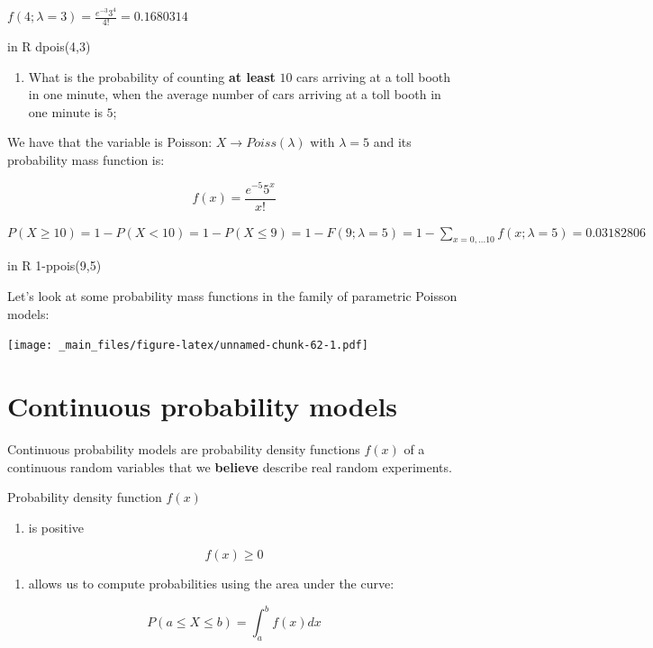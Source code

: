 \documentclass[
]{book}
\providecommand{\tightlist}{%
  \setlength{\itemsep}{0pt}\setlength{\parskip}{0pt}}
\begin{document}
\(f(4; \lambda=3)= \frac{e^{-3}3^4}{4!}=0.1680314\)

in R dpois(4,3)

\begin{enumerate}
\def\labelenumi{\arabic{enumi})}
\setcounter{enumi}{2}
\tightlist
\item
  What is the probability of counting \textbf{at least} \(10\) cars arriving at a toll booth in one minute, when the average number of cars arriving at a toll booth in one minute is \(5\);
\end{enumerate}

We have that the variable is Poisson: \(X \rightarrow Poiss(\lambda)\) with \(\lambda=5\) and its probability mass function is:

\[f(x)= \frac{e^{-5}5^x}{x!}\]

\(P(X\geq 10)=1-P(X < 10)=1-P(X \leq 9)=1-F(9; \lambda=5)=1-\sum_{x=0, ...10}f(x; \lambda=5)=0.03182806\)

in R 1-ppois(9,5)

Let's look at some probability mass functions in the family of parametric Poisson models:

\texttt{[image: \_main\_files/figure-latex/unnamed-chunk-62-1.pdf]}

\hypertarget{continuous-probability-models}{%
\section{Continuous probability models}\label{continuous-probability-models}}

Continuous probability models are probability density functions \(f(x)\) of a continuous random variables that we \textbf{believe} describe real random experiments.

Probability density function \(f(x)\)

\begin{enumerate}
\def\labelenumi{\arabic{enumi})}
\tightlist
\item
  is positive
\end{enumerate}

\[f(x) \geq 0\]

\begin{enumerate}
\def\labelenumi{\arabic{enumi})}
\setcounter{enumi}{1}
\tightlist
\item
  allows us to compute probabilities using the area under the curve:
\end{enumerate}

\[P(a\leq X \leq b)=\int_{a}^{b} f(x) dx\]
\end{document}
